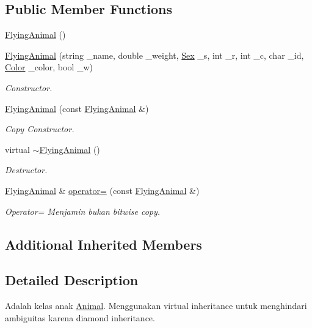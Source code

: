 \subsection*{Public Member Functions}
\begin{DoxyCompactItemize}
\item 
\hyperlink{classFlyingAnimal_ab227c4204ac6c943f73ed58360d4d543}{Flying\+Animal} ()
\item 
\hyperlink{classFlyingAnimal_ad0a3cbbdb533fc87a5621a9af5db8280}{Flying\+Animal} (string \+\_\+name, double \+\_\+weight, \hyperlink{sex_8h_a2633cb393c68bb2ee8080db58fb7ba93}{Sex} \+\_\+s, int \+\_\+r, int \+\_\+c, char \+\_\+id, \hyperlink{color_8h_ab87bacfdad76e61b9412d7124be44c1c}{Color} \+\_\+color, bool \+\_\+w)
\begin{DoxyCompactList}\small\item\em Constructor. \end{DoxyCompactList}\item 
\hyperlink{classFlyingAnimal_ab2209a5b0286a65e2908a2fb7565e600}{Flying\+Animal} (const \hyperlink{classFlyingAnimal}{Flying\+Animal} \&)
\begin{DoxyCompactList}\small\item\em Copy Constructor. \end{DoxyCompactList}\item 
virtual \hyperlink{classFlyingAnimal_a50a93cfcb6d0f216032279f463347544}{$\sim$\+Flying\+Animal} ()
\begin{DoxyCompactList}\small\item\em Destructor. \end{DoxyCompactList}\item 
\hyperlink{classFlyingAnimal}{Flying\+Animal} \& \hyperlink{classFlyingAnimal_a7ec81003eaec2f95ab01419e373ee2b3}{operator=} (const \hyperlink{classFlyingAnimal}{Flying\+Animal} \&)
\begin{DoxyCompactList}\small\item\em Operator= Menjamin bukan bitwise copy. \end{DoxyCompactList}\end{DoxyCompactItemize}
\subsection*{Additional Inherited Members}


\subsection{Detailed Description}
Adalah kelas anak \hyperlink{classAnimal}{Animal}. Menggunakan virtual inheritance untuk menghindari ambiguitas karena diamond inheritance. 

